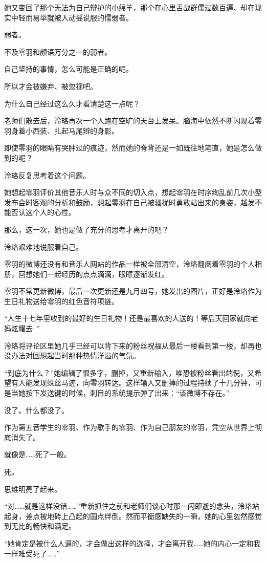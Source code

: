\documentclass[UTF8, scheme = chinese, openany]{ctexbook}
\begin{document}
她又变回了那个无法为自己辩护的小绵羊，那个在心里舌战群儒过数百遍、却在现实中轻而易举就被人动摇说服的懦弱者。

弱者。

不及零羽和颜语万分之一的弱者。

自己坚持的事情，怎么可能是正确的呢。

所以才会被嫌弃、被忽视吧。

为什么自己经过这么久才看清楚这一点呢？

老师们散去后，泠珞再次一个人跑在空旷的天台上发呆。脑海中依然不断闪现着零羽身着小西装、扎起马尾辫的身影。

即使零羽的眼睛有哭肿过的痕迹，然而她的脊背还是一如既往地笔直，她是怎么做到的呢？

泠珞反复思考着这个问题。

她想起零羽评价其他音乐人时与众不同的切入点，想起零羽在时序绚乱前几次小型发布会时客观的分析和鼓励，想起零羽在自己被骚扰时勇敢站出来的身姿，越发不能否认这个人的心性。

那么，这一次，她也是做了充分的思考才离开的吧？

泠珞艰难地说服着自己。

零羽的微博还没有和音乐人网站的作品一样被全部清空，泠珞翻阅着零羽的个人相册，回想她们一起经历的点点滴滴，眼眶逐渐发红。

零羽不常更新微博，最后一次更新还是九月四号，她发出的图片，正好是泠珞作为生日礼物送给零羽的红色音符项链。

“人生十七年里收到的最好的生日礼物！还是最喜欢的人送的！等后天回家就向老妈炫耀去~”

泠珞将评论区里她几乎已经可以背下来的粉丝祝福从最后一楼看到第一楼，却再也没办法对回想起当时那种热情洋溢的气氛。

“到底为什么？”她编辑了很多字，删掉，又重新输入，唯恐被粉丝看出端倪，又希望有人能发现蛛丝马迹，向零羽转达。这样输入又删掉的过程持续了十几分钟，可是当她按下发送键的时候，刺目的系统提示弹了出来：“该微博不存在。”

没了。什么都没了。

作为第五音学生的零羽、作为歌手的零羽、作为自己朋友的零羽，凭空从世界上彻底消失了。

就像是……死了一般。

死。

思维明亮了起来。

“对……就是这样没错……”重新抓住之前和老师们谈心时那一闪即逝的念头，泠珞站起身，差点被地砖上凸起的圆点绊倒。然而平衡感缺失的一瞬，她的心里忽然感觉到无比的畅快和满足。

“她肯定是被什么人逼的，才会做出这样的选择，才会离开我……她的内心一定和我一样难受死了……”
\end{document}
